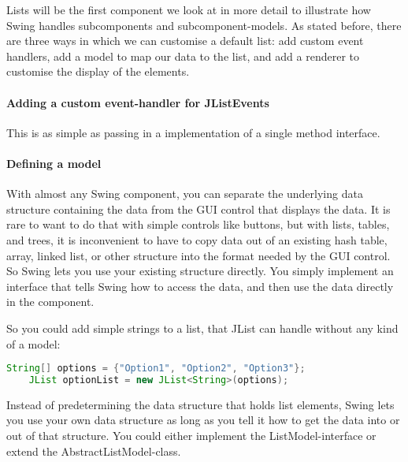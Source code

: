  Lists will be the first component we look at in more detail to illustrate how Swing handles subcomponents and subcomponent-models. As stated before, there are three ways in which we can customise a default list: add custom event handlers, add a model to map our data to the list, and add a renderer to customise the display of the elements. 
 
 \paragraph{Adding a custom event-handler for JListEvents} This is as simple as passing in a implementation of a single method interface.
 
 \paragraph{Defining a model} With almost any Swing component, you can separate the underlying data structure containing the data from the GUI control that displays the data. It is rare to want to do that with simple controls like buttons, but with lists, tables, and trees, it is inconvenient to have to copy data out of an existing hash table, array, linked list, or other structure into the format needed by the GUI control. So Swing lets you use your existing structure directly. You simply implement an interface that tells Swing how to access the data, and then use the data directly in the component. 
 
 So you could add simple strings to a list, that JList can handle without any kind of a model:
 
 \begin{lstlisting}[language=java]
    String[] options = {"Option1", "Option2", "Option3"};
    JList optionList = new JList<String>(options);
 \end{lstlisting}
 
Instead of predetermining the data structure that holds list elements, Swing lets you use your own data structure as long as you tell it how to get the data into or out of that structure. You could either implement the ListModel-interface or extend the AbstractListModel-class.
 
